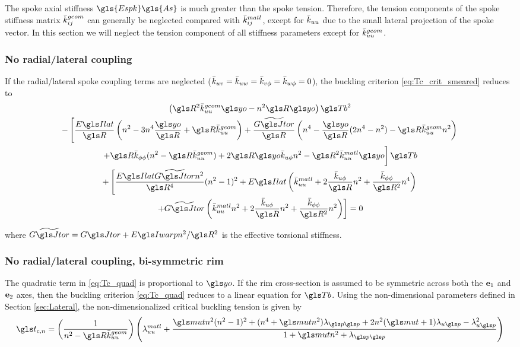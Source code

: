 \documentclass[\rootdir/thesis.tex]{subfiles}
\begin{document}
The spoke axial stiffness $\gls{Espk}\gls{As}$ is much greater than the spoke tension. Therefore, the tension components of the spoke stiffness matrix $\bar{k}_{ij}^{geom}$ can generally be neglected compared with $\bar{k}_{ij}^{matl}$, except for $\bar{k}_{uu}$ due to the small lateral projection of the spoke vector. In this section we will neglect the tension component of all stiffness parameters except for $\bar{k}_{uu}^{geom}$.

\subsubsection*{No radial/lateral coupling}
If the radial/lateral spoke coupling terms are neglected ($\bar{k}_{uv}=\bar{k}_{uw}=\bar{k}_{v\phi}=\bar{k}_{w\phi}=0$), the buckling criterion \eqref{eq:Tc_crit_smeared} reduces to
\begin{multline}
\label{eq:Tc_quad}
\left(\R^2\geom{\kuu}\yo - n^2\R\yo \right)\Tb^2\\
-\left[\frac{\EIl}{\R}\left(n^2 - 3n^4 \frac{\yo}{\R} + \R\geom{\kuu}\right)
       +\frac{\widetilde{\GJ}}{\R}\left(n^4 - \frac{\yo}{\R}(2n^4 - n^2) - \R\geom{\kuu}n^2\right) \right.\\
       \left. +\R\kpp (n^2 - \R\geom{\kuu}) + 2\R\yo\kup n^2 - \R^2\matl{\kuu} \yo \vphantom{\frac12} \right]\Tb\\
+\left[\frac{\EIl \widetilde{\GJ} n^2}{\R^4}(n^2-1)^2
       +\EIl\left(\matl{\kuu} + 2\frac{\kup}{\R}n^2 + \frac{\kpp}{\R^2}n^4\right) \right.\\
       \left. +\widetilde{\GJ}\left(\matl{\kuu} n^2 + 2\frac{\kup}{\R}n^2 + \frac{\kpp}{\R^2}n^2\right)\right]=0
\end{multline}

where $\widetilde{\GJ} = \GJ + \EIw n^2/\R^2$ is the effective torsional stiffness.

\subsubsection*{No radial/lateral coupling, bi-symmetric rim}
The quadratic term in \eqref{eq:Tc_quad} is proportional to $\yo$. If the rim cross-section is assumed to be symmetric across both the $\mathbf{e}_1$ and $\mathbf{e}_2$ axes, then the buckling criterion \eqref{eq:Tc_quad} reduces to a linear equation for $\Tb$. Using the non-dimensional parameters defined in Section \ref{sec:Lateral}, the non-dimensionalized critical buckling tension is given by
\begin{equation}
\label{eq:Tcn_lin}
\ts_{c,n} = \left(\frac{1}{n^2 - \R\geom{\kuu}}\right)
\left(\matl{\lr_{uu}}
      +\frac{\mt n^2(n^2-1)^2
             +(n^4 + \mt n^2)\lr_{\p\p}
             +2n^2(\mt + 1)\lr_{u\p} - \lr_{u\p}^2}
        {1 + \mt n^2 + \lr_{\p\p}}\right)
\end{equation}
\end{document}
